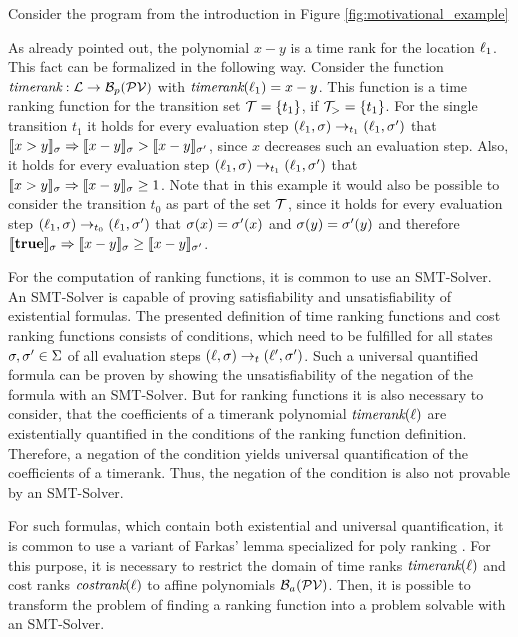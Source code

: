 \begin{example}
  Consider the program from the introduction in Figure \ref{fig:motivational_example}
  
  As already pointed out, the polynomial $x-y$ is a time rank for the location $\ell_1$.
  This fact can be formalized in the following way.
  Consider the function $\emph{timerank}: \mathcal{L} \rightarrow \mathcal{B}_p(\mathcal{PV})$ with $\emph{timerank}(\ell_1) = x-y$.
  This function is a time ranking function for the transition set $\mathcal{T} = \lbrace t_1 \rbrace$, if $\mathcal{T}_> = \lbrace t_1 \rbrace$.
  For the single transition $t_1$ it holds for every evaluation step $(\ell_1,\sigma) \rightarrow_{t_1} (\ell_1,\sigma')$ that $\llbracket x>y \rrbracket_{\sigma} \Rightarrow \llbracket x-y \rrbracket_{\sigma} > \llbracket x-y \rrbracket_{\sigma'}$, since $x$ decreases such an evaluation step.
  Also, it holds for every evaluation step $(\ell_1,\sigma) \rightarrow_{t_1} (\ell_1,\sigma')$ that $\llbracket x>y \rrbracket_{\sigma} \Rightarrow \llbracket x-y \rrbracket_{\sigma} \geq 1$.
  Note that in this example it would also be possible to consider the transition $t_0$ as part of the set $\mathcal{T}$, since it holds for every evaluation step $(\ell_1,\sigma) \rightarrow_{t_0} (\ell_1,\sigma')$ that $\sigma(x)=\sigma'(x)$ and $\sigma(y)=\sigma'(y)$ and therefore $\llbracket \textbf{true} \rrbracket_{\sigma} \Rightarrow \llbracket x-y \rrbracket_{\sigma} \geq \llbracket x-y \rrbracket_{\sigma'}$.
\end{example}

For the computation of ranking functions, it is common to use an SMT-Solver.
An SMT-Solver is capable of proving satisfiability and unsatisfiability of existential formulas.
The presented definition of time ranking functions and cost ranking functions consists of conditions, which need to be fulfilled for all states $\sigma, \sigma' \in \Sigma$ of all evaluation steps $(\ell, \sigma) \rightarrow_t (\ell', \sigma')$.
Such a universal quantified formula can be proven by showing the unsatisfiability of the negation of the formula with an SMT-Solver.
But for ranking functions it is also necessary to consider, that the coefficients of a timerank polynomial $\emph{timerank}(\ell)$ are existentially quantified in the conditions of the ranking function definition.
Therefore, a negation of the condition yields universal quantification of the coefficients of a timerank.
Thus, the negation of the condition is also not provable by an SMT-Solver.

For such formulas, which contain both existential and universal quantification, it is common to use a variant of Farkas' lemma \cite{schrijver1998theory} specialized for poly ranking \cite{bradley2005polyranking}.
For this purpose, it is necessary to restrict the domain of time ranks $\emph{timerank}(\ell)$ and cost ranks $\emph{costrank}(\ell)$ to affine polynomials $\mathcal{B}_a(\mathcal{PV})$.
Then, it is possible to transform the problem of finding a ranking function into a problem solvable with an SMT-Solver.
